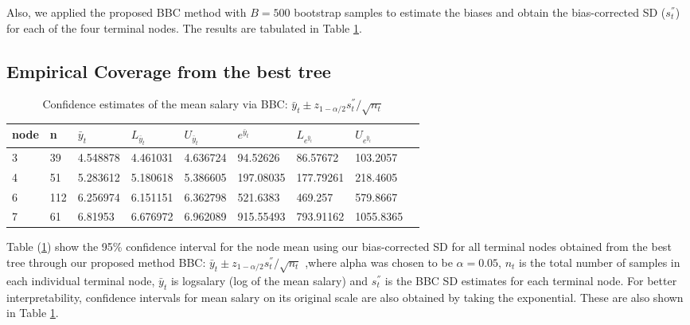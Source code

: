 Also, we applied the proposed BBC method with $B=500$ bootstrap samples to estimate the biases and obtain the bias-corrected SD ($s_t^{''}$) for each of the four terminal nodes. The results are tabulated in Table \ref{table:RealD_CI}.


\subsection{Empirical Coverage from the best tree}
\vspace{0.1in}
\begin{table}[H]
	\caption{Confidence  estimates of the mean  salary via BBC: $\bar{y}_t \pm z_{1-\alpha/2} s^{''}_t /\sqrt{n_t}$ }
	\vspace{0.1in}
	\begin{tabular}{ |p{1cm}|p{1cm}|p{2cm}|p{2cm}| p{2cm}|p{2cm}|p{2cm}|p{2cm}|p{2cm}|}
		\hline
		node  &n   &$\bar{y}_{t}$ &	$L_{\bar{y}_{t}}$ &$U_{\bar{y}_{t}}$ & $e^{\bar{y}_{t}}$ & $L_{e^{\bar{y}_{t}}}$&$U_{e^{\bar{y}_{t}}}$\\
		\hline
		3&	39&	4.548878&	4.461031&	4.636724&	94.52626&	86.57672&	103.2057
\\
		4&	51&	5.283612&	5.180618&	5.386605&	197.08035&	177.79261&	218.4605
\\
		6&	112&	6.256974&	6.151151&	6.362798&	521.6383&	469.257	&579.8667
\\
		7&	61&	6.81953&	6.676972&	6.962089&	915.55493&	793.91162&	1055.8365\\
		\hline
	\end{tabular}
	\label{table:RealD_CI}
\end{table}
Table (\ref{table:RealD_CI}) show the 95\% confidence interval for the node mean using our bias-corrected SD for all terminal nodes obtained from the best tree through our proposed method BBC: $\bar{y}_t \pm z_{1-\alpha/2} s^{''}_t /\sqrt{n_t}$ ,where  alpha was chosen to be $\alpha=0.05$, $n_t$ is the total number of samples in  each individual terminal node, $\bar{y}_{t}$ is logsalary (log of the mean salary) and $s_t^{''}$ is the BBC SD estimates for each terminal node. For better interpretability, confidence intervals for mean salary on its original scale are also obtained by taking the exponential. These are also shown in Table \ref{table:RealD_CI}.  

